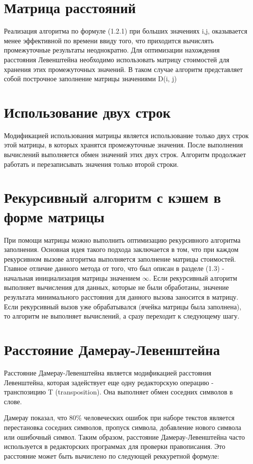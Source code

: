 \section{Матрица расстояний}
Реализация алгоритма по формуле (1.2.1) при больших значениях i,j, оказывается менее эффективной по времени ввиду того, что приходится вычислять промежуточные результаты неоднократно. Для оптимизации нахождения расстояния Левенштейна необходимо использовать матрицу стоимостей для хранения этих промежуточных значений. В таком случае алгоритм представляет собой построчное заполнение матрицы значениями D(i, j) 

\section{Использование двух строк}
Модификацией использования матрицы является использование только двух строк этой матрицы, в которых хранятся промежуточные значения. После выполнения вычислений выполняется обмен значений этих двух строк. Алгоритм продолжает работать и перезаписывать значения только второй строки.

\section{Рекурсивный алгоритм с кэшем в форме матрицы}
При помощи матрицы можно выполнить оптимизацию рекурсивного алгоритма заполнения. Основная идея такого подхода заключается в том, что при каждом рекурсивном вызове алгоритма выполняется заполнение матрицы стоимостей. Главное отличие данного метода от того, что был описан в разделе (1.3) - начальная инициализация матрицы значением $\infty$. Если рекурсивный алгоритм выполняет вычисления для данных, которые не были обработаны, значение результата минимального расстояния для данного вызова заносится в матрицу. Если рекурсивный вызов уже обрабатывался (ячейка матрицы была заполнена), то алгоритм не выполняет вычислений, а сразу переходит к следующему шагу.

\section{Расстояние Дамерау-Левенштейна}
Расстояние Дамерау-Левенштейна является модификацией расстояния Левенштейна, которая задействует еще одну редакторскую операцию - транспозицию T
(transposition). Она выполняет обмен соседних символов в слове.

Дамерау показал, что 80\% человеческих ошибок при наборе текстов является перестановка соседних символов, пропуск символа, добавление нового символа или ошибочный символ\cite{Damerau_Levenshtein}. Таким образом, расстояние Дамерау-Левенштейна часто используется в редакторских программах для проверки правописания.
Это расстояние может быть вычислено по следующей реккуретной формуле:

